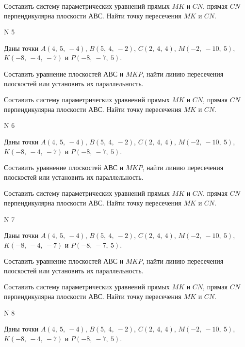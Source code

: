\documentclass[11pt]{report}
\begin{document}
Составить систему параметрических уравнений прямых $MK$ и $CN$,
прямая $CN$ перпендикулярна плоскости $АВС$. 
Найти точку пересечения $MK$ и $CN$.



 N 5

Даны точки $A\left( 4, \  5, \  -4\right)$, $B\left( 5, \  4, \  -2\right)$, $C\left( 2, \  4, \  4\right)$, $M\left( -2, \  -10, \  5\right)$, $K\left( -8, \  -4, \  -7\right)$ и $P\left( -8, \  -7, \  5\right)$.


Составить уравнение плоскостей $АВС$ и $MKP$,
найти линию пересечения плоскостей или установить их параллельность.

Составить систему параметрических уравнений прямых $MK$ и $CN$,
прямая $CN$ перпендикулярна плоскости $АВС$. 
Найти точку пересечения $MK$ и $CN$.



 N 6

Даны точки $A\left( 4, \  5, \  -4\right)$, $B\left( 5, \  4, \  -2\right)$, $C\left( 2, \  4, \  4\right)$, $M\left( -2, \  -10, \  5\right)$, $K\left( -8, \  -4, \  -7\right)$ и $P\left( -8, \  -7, \  5\right)$.


Составить уравнение плоскостей $АВС$ и $MKP$,
найти линию пересечения плоскостей или установить их параллельность.

Составить систему параметрических уравнений прямых $MK$ и $CN$,
прямая $CN$ перпендикулярна плоскости $АВС$. 
Найти точку пересечения $MK$ и $CN$.



 N 7

Даны точки $A\left( 4, \  5, \  -4\right)$, $B\left( 5, \  4, \  -2\right)$, $C\left( 2, \  4, \  4\right)$, $M\left( -2, \  -10, \  5\right)$, $K\left( -8, \  -4, \  -7\right)$ и $P\left( -8, \  -7, \  5\right)$.


Составить уравнение плоскостей $АВС$ и $MKP$,
найти линию пересечения плоскостей или установить их параллельность.

Составить систему параметрических уравнений прямых $MK$ и $CN$,
прямая $CN$ перпендикулярна плоскости $АВС$. 
Найти точку пересечения $MK$ и $CN$.



 N 8

Даны точки $A\left( 4, \  5, \  -4\right)$, $B\left( 5, \  4, \  -2\right)$, $C\left( 2, \  4, \  4\right)$, $M\left( -2, \  -10, \  5\right)$, $K\left( -8, \  -4, \  -7\right)$ и $P\left( -8, \  -7, \  5\right)$.
\end{document}
